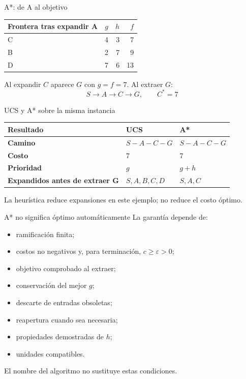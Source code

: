 \documentclass[aspectratio=169,11pt]{beamer}
\begin{document}
\begin{frame}{A*: de A al objetivo}
  \small
  \begin{tabular}{lrrr}
    \toprule
    Frontera tras expandir A & $g$ & $h$ & $f$ \\\midrule
    C & 4 & 3 & 7 \\
    B & 2 & 7 & 9 \\
    D & 7 & 6 & 13 \\
    \bottomrule
  \end{tabular}
  \vfill
  Al expandir $C$ aparece $G$ con $g=f=7$. Al extraer $G$:
  \[
    \boxed{S\rightarrow A\rightarrow C\rightarrow G,\qquad C^*=7}
  \]
\end{frame}

\begin{frame}{UCS y A* sobre la misma instancia}
  \small
  \begin{tabularx}{\textwidth}{>{\bfseries}p{}XX}
    \toprule
    Resultado & UCS & A* \\\midrule
    Camino & $S-A-C-G$ & $S-A-C-G$ \\
    Costo & 7 & 7 \\
    Prioridad & $g$ & $g+h$ \\
    Expandidos antes de extraer G & $S,A,B,C,D$ & $S,A,C$ \\
    \bottomrule
  \end{tabularx}
  \vfill
  \alert{La heurística reduce expansiones en este ejemplo; no reduce el costo óptimo.}
\end{frame}

\begin{frame}{A* no significa óptimo automáticamente}
  \small
  La garantía depende de:
  \begin{itemize}
    \item ramificación finita;
    \item costos no negativos y, para terminación, $c\geq\varepsilon>0$;
    \item objetivo comprobado al extraer;
    \item conservación del mejor $g$;
    \item descarte de entradas obsoletas;
    \item reapertura cuando sea necesaria;
    \item propiedades demostradas de $h$;
    \item unidades compatibles.
  \end{itemize}
  \alert{El nombre del algoritmo no sustituye estas condiciones.}
\end{frame}
\end{document}
